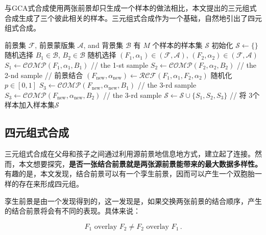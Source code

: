 \documentclass[supercite]{HustGraduPaper}
\begin{document}
	与GCA式合成使用两张前景却只生成一个样本的做法相比，本文提出的三元组式合成生成了三个彼此相关的样本。三元组式合成作为一个基础，自然地引出了四元组式合成。
	\begin{algorithm}[!t] 
		\caption{三元组式合成} 
		\label{alg:tri-style} 
		\begin{algorithmic}
		\REQUIRE 前景集 $\mathcal{F}$, 前景蒙版集 $\mathcal{A}$, and 背景集 $\mathcal{B}$
		\ENSURE 有 $M$ 个样本的样本集 $\mathcal{S}$ 
		\STATE 初始化 $\mathcal{S}\leftarrow\{\}$
			\STATE 随机选择 $B_1\in\mathcal{B}$, $B_2\in\mathcal{B}$
			\STATE 随机选择 $(F_1,\alpha_1)\in (\mathcal{F},\mathcal{A})$, $(F_2,\alpha_2) \in (\mathcal{F},\mathcal{A})$
			\STATE $S_1\leftarrow \mathcal{COMP}(F_1,\alpha_1,B_1)$ \textcolor{mygreen}{// the 1-st sample}
			\STATE $S_2\leftarrow \mathcal{COMP}(F_2,\alpha_2,B_2)$ \textcolor{mygreen}{// the 2-nd sample}
			\STATE \textcolor{mygreen}{// 前景结合}
			\STATE $(F_{\mathrm{new}},\alpha_{\mathrm{new}})\leftarrow \mathcal{RCF}(F_1,\alpha_1,F_2,\alpha_2)$
			\STATE 随机化 $p\in[0,1]$
			\STATE $S_3\leftarrow \mathcal{COMP}(F_{\mathrm{new}},\alpha_{\mathrm{new}},B_1)$ \textcolor{mygreen}{// the 3-rd sample}
			\ELSE
			\STATE $S_3\leftarrow \mathcal{COMP}(F_{\mathrm{new}},\alpha_{\mathrm{new}},B_2)$ \textcolor{mygreen}{// the 3-rd sample}
			\ENDIF
			\STATE $\mathcal{S}\leftarrow \mathcal{S} \cup \{S_1,S_2,S_3\}$
			\textcolor{mygreen}{// 将 $3$个样本加入样本集$\mathcal{S}$}
		\ENDFOR
		\end{algorithmic}
	\end{algorithm}


	
	
	\subsection{四元组式合成}
	三元组式合成在父母和孩子之间通过利用源前景地信息地方式，建立起了连接。然而，本文想要探究，\textbf{是否一张结合前景就是两张源前景能带来的最大数据多样性。}有趣的是，本文发现，结合前景可以有一个孪生前景，因而可以产生一个双胞胎一样的存在来形成四元组。

	孪生前景是由一个发现得到的，这一发现是，如果交换两张前景的结合顺序，产生的结合前景将会有不同的表现。具体来说：

	\begin{equation*}
		\label{assert}
		F_{1} \text{ overlay } F_{2} \neq F_{2} \text { 		overlay } F_{1}\,.
	\end{equation*}
\end{document}
